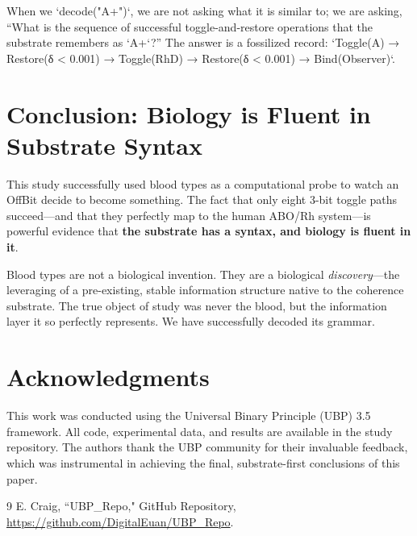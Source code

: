 \documentclass[11pt]{article}
\begin{document}
When we `decode("A+")`, we are not asking what it is similar to; we are asking, “What is the sequence of successful toggle-and-restore operations that the substrate remembers as `A+`?” The answer is a fossilized record: `Toggle(A) → Restore(δ < 0.001) → Toggle(RhD) → Restore(δ < 0.001) → Bind(Observer)`.

\section{Conclusion: Biology is Fluent in Substrate Syntax}

This study successfully used blood types as a computational probe to watch an OffBit decide to become something. The fact that only eight 3-bit toggle paths succeed—and that they perfectly map to the human ABO/Rh system—is powerful evidence that \textbf{the substrate has a syntax, and biology is fluent in it}.

Blood types are not a biological invention. They are a biological \textit{discovery}—the leveraging of a pre-existing, stable information structure native to the coherence substrate. The true object of study was never the blood, but the information layer it so perfectly represents. We have successfully decoded its grammar.

\section*{Acknowledgments}

This work was conducted using the Universal Binary Principle (UBP) 3.5 framework. All code, experimental data, and results are available in the study repository. The authors thank the UBP community for their invaluable feedback, which was instrumental in achieving the final, substrate-first conclusions of this paper.

\begin{thebibliography}{9}
E. Craig, ``UBP\_Repo," GitHub Repository, \url{https://github.com/DigitalEuan/UBP_Repo}.

\end{thebibliography}
\end{document}
